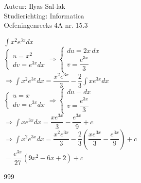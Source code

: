 \documentclass[a4paper]{article}
\newcommand{\dint}{\displaystyle\int}
\begin{document}
\noindent \large Auteur: Ilyas Sal-lak \\
\noindent \large Studierichting: Informatica\\
\noindent \large Oefeningenreeks 4A nr. 15.3\\
\medskip
\normalsize

$\dint x^2 e^{3x} dx$ \\

$\left\{
\begin{array}{l}
u = x^2 \\
dv = e^{3x} dx
\end{array}
\right.
\Rightarrow
\left\{
\begin{array}{l}
du = 2x \, dx \\
v = \dfrac{e^{3x}}{3}
\end{array}
\right.$ \\

$\Rightarrow \dint x^2 e^{3x} dx = \dfrac{x^2 e^{3x}}{3} - \dfrac{2}{3} \dint x e^{3x} dx$ \\

$\left\{
\begin{array}{l}
u = x \\
dv = e^{3x} dx
\end{array}
\right.
\Rightarrow
\left\{
\begin{array}{l}
du = dx \\
v = \dfrac{e^{3x}}{3}
\end{array}
\right.$ \\

$\Rightarrow \dint x e^{3x} dx = \dfrac{x e^{3x}}{3} - \dfrac{e^{3x}}{9} + c$ \\

$\Rightarrow \dint x^2 e^{3x} dx = \dfrac{x^2 e^{3x}}{3} - \dfrac{2}{3}\left(\dfrac{x e^{3x}}{3} - \dfrac{e^{3x}}{9}\right) + c$ \\

$= \dfrac{e^{3x}}{27}(9x^2 - 6x + 2) + c$

\begin{thebibliography}{999}
\end{thebibliography}
\end{document}
